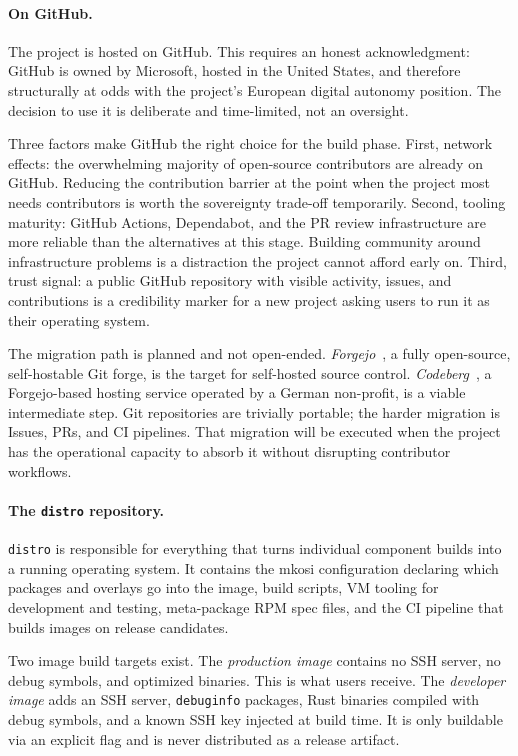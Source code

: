 \paragraph{On GitHub.}
The project is hosted on GitHub. This requires an honest acknowledgment:
GitHub is owned by Microsoft, hosted in the United States, and therefore
structurally at odds with the project's European digital autonomy position.
The decision to use it is deliberate and time-limited, not an oversight.

Three factors make GitHub the right choice for the build phase. First,
network effects: the overwhelming majority of open-source contributors are
already on GitHub. Reducing the contribution barrier at the point when the
project most needs contributors is worth the sovereignty trade-off temporarily.
Second, tooling maturity: GitHub Actions, Dependabot, and the PR review
infrastructure are more reliable than the alternatives at this stage. Building
community around infrastructure problems is a distraction the project cannot
afford early on. Third, trust signal: a public GitHub repository with visible
activity, issues, and contributions is a credibility marker for a new project
asking users to run it as their operating system.

The migration path is planned and not open-ended.
\emph{Forgejo}~\cite{forgejo}, a fully open-source, self-hostable Git forge,
is the target for self-hosted source control. \emph{Codeberg}~\cite{codeberg},
a Forgejo-based hosting service operated by a German non-profit, is a viable
intermediate step. Git repositories are trivially portable; the harder
migration is Issues, PRs, and CI pipelines. That migration will be executed
when the project has the operational capacity to absorb it without disrupting
contributor workflows.

\paragraph{The \texttt{distro} repository.}
\texttt{distro} is responsible for everything that turns individual component
builds into a running operating system. It contains the mkosi configuration
declaring which packages and overlays go into the image, build scripts, VM
tooling for development and testing, meta-package RPM spec files, and the CI
pipeline that builds images on release candidates.

Two image build targets exist. The \emph{production image} contains no SSH
server, no debug symbols, and optimized binaries. This is what users receive.
The \emph{developer image} adds an SSH server, \texttt{debuginfo} packages,
Rust binaries compiled with debug symbols, and a known SSH key injected at
build time. It is only buildable via an explicit flag and is never distributed
as a release artifact.

